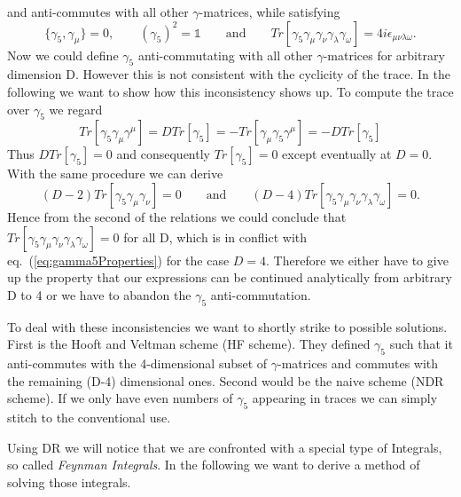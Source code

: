 and anti-commutes with all other $\gamma$-matrices, while satisfying
\begin{equation}
	\label{eq:gamma5Properties}
	\{\gamma_5, \gamma_\mu\} = 0, \qquad (\gamma_5)^2 = \mathbb{1} \qquad \text{and} \qquad Tr[\gamma_5 \gamma_\mu \gamma_\nu \gamma_\lambda \gamma_\omega] = 4i\epsilon_{\mu\nu\lambda\omega}.
\end{equation}
Now we could define $\gamma_5$ anti-commutating with all other $\gamma$-matrices for arbitrary dimension D. However this is not consistent with the cyclicity of the trace. In the following we want to show how this inconsistency shows up. To compute the trace over $\gamma_5$ we regard 
\begin{equation}
	Tr[\gamma_5\gamma_\mu\gamma^\mu] = DTr[\gamma_5] = -Tr[\gamma_\mu \gamma_5 \gamma^\mu] = -DTr[\gamma_5]
\end{equation}
Thus $DTr[\gamma_5] = 0$ and consequently $Tr[\gamma_5] = 0$ except eventually at $D=0$. With the same procedure we can derive
\begin{equation}
	(D-2)Tr[\gamma_5\gamma_\mu\gamma_\nu] = 0 \qquad \text{and} \qquad (D-4)Tr[\gamma_5 \gamma_\mu \gamma_\nu \gamma_\lambda \gamma_\omega] = 0.
\end{equation}
Hence from the second of the relations we could conclude that $Tr[\gamma_5\gamma_\mu\gamma_\nu\gamma_\lambda\gamma_\omega] = 0$ for all D, which is in conflict with eq.~(\ref{eq:gamma5Properties}) for the case $D=4$. Therefore we either have to give up the property that our expressions can be continued analytically from arbitrary D to 4 or we have to abandon the $\gamma_5$ anti-commutation. 
\par
To deal with these inconsistencies we want to shortly strike to possible solutions. First is the Hooft and Veltman scheme (HF scheme). They defined $\gamma_5$ such that it anti-commutes with the 4-dimensional subset of $\gamma$-matrices and commutes with the remaining (D-4) dimensional ones. Second would be the naive scheme (NDR scheme). If we only have even numbers of $\gamma_5$ appearing in traces we can simply stitch to the conventional use. 
\par 
Using DR we will notice that we are confronted with a special type of Integrals, so called \textit{Feynman Integrals}. In the following we want to derive a method of solving those integrals.
	
